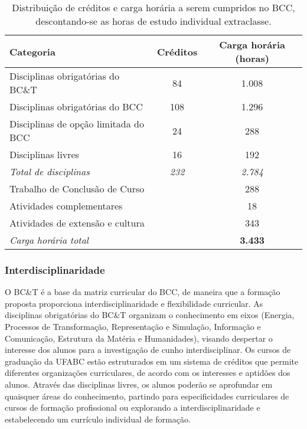 \begin{table}[h!]
    \centering
    \caption{Distribuição de créditos e carga horária a serem cumpridos no BCC,
    descontando-se as horas de estudo individual extraclasse.}
    \label{tab:carga_horaria}
    \begin{tabular}{|l|c|c|}
        \hline
        \textbf{Categoria}                        & \textbf{Créditos} & \textbf{Carga horária (horas)} \\
        \hline\hline
        Disciplinas obrigatórias do BC\&T         & 84                & 1.008 \\
        \hline
        Disciplinas obrigatórias do BCC           & 108               & 1.296 \\
        \hline
        Disciplinas de opção limitada do BCC      & 24                & 288 \\
        \hline
        Disciplinas livres                        & 16                 & 192 \\
        \hline
        \textit{Total de disciplinas}             & \textit{232}       & \textit{2.784}\\
        \hline\hline
        \multicolumn{2}{|l|}{Trabalho de Conclusão de Curso}       & 288 \\
        \multicolumn{2}{|l|}{Atividades complementares}            & 18 \\
        \hline
        \multicolumn{2}{|l|}{Atividades de extensão e cultura}      & 343 \\
        \hline
        \multicolumn{2}{|l|}{\textit{Carga horária total}}               & \textbf{3.433}\\
        \hline
    \end{tabular}
\end{table}




\subsubsection{Interdisciplinaridade}

O BC\&T é a base da matriz curricular do BCC, de maneira que a formação
proposta proporciona interdisciplinaridade e flexibilidade curricular.
As disciplinas obrigatórias do BC\&T organizam o conhecimento em eixos
(Energia, Processos de Transformação, Representação e Simulação, Informação e
Comunicação, Estrutura da Matéria e Humanidades), visando despertar o interesse
dos alunos para a investigação de cunho interdisciplinar.
Os cursos de graduação da UFABC estão estruturados em um sistema de créditos
que permite diferentes organizações curriculares, de acordo com os interesses e
aptidões dos alunos.
Através das disciplinas livres, os alunos poderão se aprofundar em quaisquer
áreas do conhecimento, partindo para especificidades curriculares de cursos de
formação profissional ou explorando a interdisciplinaridade e estabelecendo um
currículo individual de formação.


